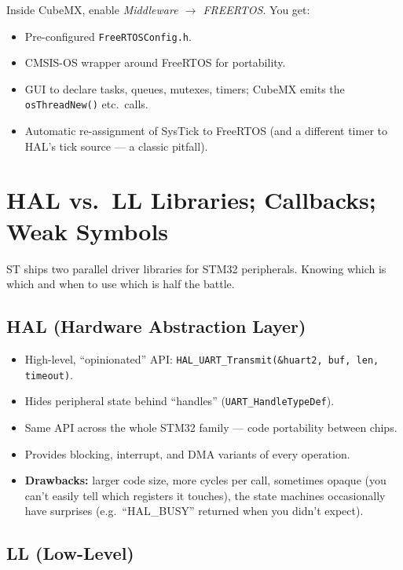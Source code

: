 \documentclass[11pt,a4paper]{article}
\begin{document}
Inside CubeMX, enable \emph{Middleware $\rightarrow$ FREERTOS}. You get:
\begin{itemize}[leftmargin=*]
    \item Pre-configured \texttt{FreeRTOSConfig.h}.
    \item CMSIS-OS wrapper around FreeRTOS for portability.
    \item GUI to declare tasks, queues, mutexes, timers; CubeMX emits the
    \texttt{osThreadNew()} etc.\ calls.
    \item Automatic re-assignment of SysTick to FreeRTOS (and a different
    timer to HAL's tick source --- a classic pitfall).
\end{itemize}

\section{HAL vs.\ LL Libraries; Callbacks; Weak Symbols}

ST ships two parallel driver libraries for STM32 peripherals. Knowing
which is which and when to use which is half the battle.

\subsection{HAL (Hardware Abstraction Layer)}

\begin{itemize}[leftmargin=*]
    \item High-level, ``opinionated'' API: \texttt{HAL\_UART\_Transmit(\&huart2,
    buf, len, timeout)}.
    \item Hides peripheral state behind ``handles'' (\texttt{UART\_HandleTypeDef}).
    \item Same API across the whole STM32 family --- code portability between
    chips.
    \item Provides blocking, interrupt, and DMA variants of every operation.
    \item \textbf{Drawbacks:} larger code size, more cycles per call,
    sometimes opaque (you can't easily tell which registers it touches),
    the state machines occasionally have surprises (e.g.\ ``HAL\_BUSY''
    returned when you didn't expect).
\end{itemize}

\subsection{LL (Low-Level)}
\end{document}
